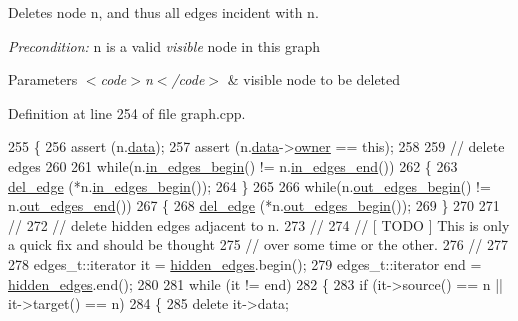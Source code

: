 Deletes node {\ttfamily n}, and thus all edges incident with {\ttfamily n}.

{\itshape Precondition\+:} {\ttfamily n} is a valid {\itshape visible} node in this graph


\begin{DoxyParams}{Parameters}
{\em $<$code$>$n$<$/code$>$} & visible node to be deleted \\
\hline
\end{DoxyParams}


Definition at line 254 of file graph.\+cpp.


\begin{DoxyCode}
255 \{
256     assert (n.\mbox{\hyperlink{classnode_a4ae3d54ebb61be3a102bedf5b91bef75}{data}});
257     assert (n.\mbox{\hyperlink{classnode_a4ae3d54ebb61be3a102bedf5b91bef75}{data}}->\mbox{\hyperlink{classnode__data_a20acb07c56fa28df6cbdbf3b0a02cb66}{owner}} == \textcolor{keyword}{this});
258 
259     \textcolor{comment}{// delete edges}
260 
261     \textcolor{keywordflow}{while}(n.\mbox{\hyperlink{classnode_a0c32377f370ae52ed2134ff8d4dac584}{in\_edges\_begin}}() != n.\mbox{\hyperlink{classnode_a785cd330f8b4c5c47d3b6e936a7e744e}{in\_edges\_end}}())
262     \{
263     \mbox{\hyperlink{classgraph_ad9356508c49c542dfd4b7169297387c6}{del\_edge}} (*n.\mbox{\hyperlink{classnode_a0c32377f370ae52ed2134ff8d4dac584}{in\_edges\_begin}}());
264     \}
265 
266     \textcolor{keywordflow}{while}(n.\mbox{\hyperlink{classnode_a7dcb80df22118cea04f77ca8c952d9c2}{out\_edges\_begin}}() != n.\mbox{\hyperlink{classnode_a7ce2ba5195a63d4df6b44299a02a9378}{out\_edges\_end}}())
267     \{
268     \mbox{\hyperlink{classgraph_ad9356508c49c542dfd4b7169297387c6}{del\_edge}} (*n.\mbox{\hyperlink{classnode_a7dcb80df22118cea04f77ca8c952d9c2}{out\_edges\_begin}}());
269     \}
270 
271     \textcolor{comment}{//}
272     \textcolor{comment}{// delete hidden edges adjacent to n.  }
273     \textcolor{comment}{// }
274     \textcolor{comment}{// [ TODO ] This is only a quick fix and should be thought}
275     \textcolor{comment}{// over some time or the other.}
276     \textcolor{comment}{// }
277 
278     edges\_t::iterator it = \mbox{\hyperlink{classgraph_a0d3da33d047ba7cdc3dc68b5d9c84b88}{hidden\_edges}}.begin();
279     edges\_t::iterator end = \mbox{\hyperlink{classgraph_a0d3da33d047ba7cdc3dc68b5d9c84b88}{hidden\_edges}}.end();
280 
281     \textcolor{keywordflow}{while} (it != end)
282     \{ 
283     \textcolor{keywordflow}{if} (it->source() == n || it->target() == n)
284     \{
285         \textcolor{keyword}{delete} it->data;

\end{DoxyCode}
